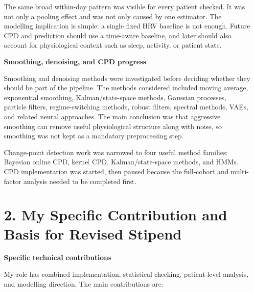 \documentclass[10pt,a4paper]{article}
\begin{document}
The same broad within-day pattern was visible for every patient checked. It was not only a pooling effect and was not only caused by one estimator. The modelling implication is simple: a single fixed HRV baseline is not enough. Future CPD and prediction should use a time-aware baseline, and later should also account for physiological context such as sleep, activity, or patient state.

\textbf{Smoothing, denoising, and CPD progress}

Smoothing and denoising methods were investigated before deciding whether they should be part of the pipeline. The methods considered included moving average, exponential smoothing, Kalman/state-space methods, Gaussian processes, particle filters, regime-switching methods, robust filters, spectral methods, VAEs, and related neural approaches. The main conclusion was that aggressive smoothing can remove useful physiological structure along with noise, so smoothing was not kept as a mandatory preprocessing step.

Change-point detection work was narrowed to four useful method families: Bayesian online CPD, kernel CPD, Kalman/state-space methods, and HMMs. CPD implementation was started, then paused because the full-cohort and multi-factor analysis needed to be completed first.

\newpage

\section{2. My Specific Contribution and Basis for Revised Stipend}

\textbf{Specific technical contributions}

My role has combined implementation, statistical checking, patient-level analysis, and modelling direction. The main contributions are:
\end{document}
